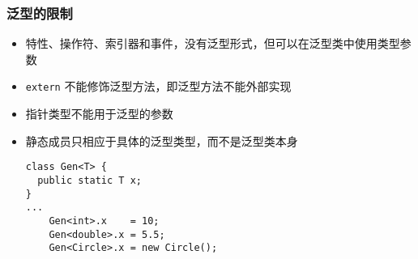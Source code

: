 \begin{frame}[fragile]
\frametitle{泛型的限制}
\begin{itemize}
\setlength{\itemsep}{8pt plus 1pt}
\item 特性、操作符、索引器和事件，没有泛型形式，但可以在泛型类中使用类型参数
\item \texttt{extern} 不能修饰泛型方法，即泛型方法不能外部实现
\item 指针类型不能用于泛型的参数
\item 静态成员只相应于具体的泛型类型，而不是泛型类本身
\begin{lstlisting}
class Gen<T> {
  public static T x;
}
...
    Gen<int>.x    = 10;
    Gen<double>.x = 5.5;
    Gen<Circle>.x = new Circle();
\end{lstlisting}
\end{itemize}
\end{frame}

